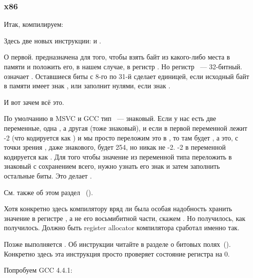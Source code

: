 \subsubsection{x86}


Итак, компилируем:



Здесь две новых инструкции: \MOVSX и \TEST.

\label{MOVSX}
О первой. \MOVSX предназначена для того, чтобы взять байт из какого-либо места в памяти и положить его, 
в нашем случае, в регистр \EDX. 
Но регистр \EDX~--- 32-битный. \MOVSX означает . 
Оставшиеся биты с 8-го по 31-й \MOVSX сделает единицей, если исходный байт в памяти имеет знак , 
или заполнит нулями, если знак .

И вот зачем всё это.

По умолчанию в MSVC и GCC тип \Tchar~--- знаковый. Если у нас есть две переменные, одна \Tchar, а другая \Tint 
(\Tint тоже знаковый), и если в первой переменной лежит -2 (что кодируется как ) и мы просто 
переложим это в \Tint, 
то там будет , а это, с точки зрения \Tint, даже знакового, будет 254, но никак не -2. 
-2 в переменной \Tint кодируется как . Для того чтобы значение  из переменной типа 
\Tchar переложить 
в знаковый \Tint с сохранением всего, нужно узнать его знак и затем заполнить остальные биты. 
Это делает \MOVSX.

См. также об этом раздел
 \q{\IT{\SignedNumbersSectionName}}~().

Хотя конкретно здесь компилятору вряд ли была особая надобность хранить значение \Tchar в регистре \EDX, 
а не его восьмибитной части, скажем \DL. Но получилось, как получилось. Должно быть 
\gls{register allocator} компилятора сработал именно так.

Позже выполняется . 
Об инструкции \TEST читайте в разделе о битовых полях~().
Конкретно здесь эта инструкция просто проверяет состояние регистра \EDX на 0.


Попробуем GCC 4.4.1:



